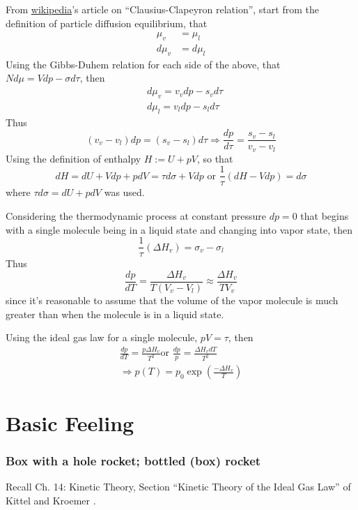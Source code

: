 \documentclass[10pt]{amsart}
\begin{document}
\begin{multicols*}{2}
From \href{https://en.wikipedia.org/wiki/Clausius–Clapeyron_relation}{wikipedia}'s article on ``Clausius-Clapeyron relation'', start from the definition of particle diffusion equilibrium, that 
\[
\begin{aligned}
  \mu_v & = \mu_l \\
  d \mu_v & = d \mu_l
\end{aligned}
\]
Using the Gibbs-Duhem relation for each side of the above, that $N d\mu = Vdp - \sigma d\tau$, then
\[
\begin{aligned}
  & d\mu_v = v_v dp- s_v d\tau \\ 
  & d\mu_l = v_l dp- s_l d\tau
\end{aligned}
\]
Thus
\[
(v_v - v_l) dp = (s_v - s_l) d\tau \Longrightarrow \boxed{ \frac{dp}{d\tau} = \frac{s_v - s_l }{ v_v - v_l } }
\]
Using the definition of enthalpy $H:= U + pV$, so that 
\[
dH = dU + Vdp + pdV = \tau d\sigma + Vdp \text{ or } \frac{1}{\tau} ( dH - Vdp) = d\sigma
\]
where $\tau d\sigma = dU + pdV$ was used.  

Considering the thermodynamic process at constant pressure $dp=0$ that begins with a single molecule being in a liquid state and changing into vapor state, then
\[
\frac{1}{\tau} (\Delta H_v) = \sigma_v - \sigma_l
\]
Thus
\[
\frac{dp}{dT} = \frac{ \Delta H_v}{ T (V_v-V_l ) } \approx \frac{\Delta H_v}{ TV_v}
\]
since it's reasonable to assume that the volume of the vapor molecule is much greater than when the molecule is in a liquid state.  

Using the ideal gas law for a single molecule, $pV = \tau$, then
\[
\begin{gathered}
  \frac{dp}{dT} = \frac{ p\Delta H_v}{T^2} \text {or } \frac{dp}{p} = \frac{\Delta H_v dT}{T^2} \\
  \Longrightarrow p(T) = p_0 \exp{ \left( \frac{- \Delta H_v}{T} \right) }
\end{gathered}
\]


\part{Basic Feeling}

\section{Box with a hole rocket; bottled (box) rocket}

Recall Ch. 14: Kinetic Theory, Section ``Kinetic Theory of the Ideal Gas Law'' of Kittel and Kroemer \cite{CKittelHKroemer1980}.


\end{multicols*}
\end{document}
